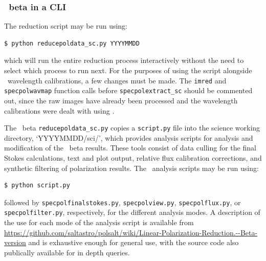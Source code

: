
\subsubsection{\polsalt\ beta in a \gls{CLI}}

The reduction script may be run using:
\begin{lstlisting}[language=bash]
$ python reducepoldata_sc.py YYYYMMDD
\end{lstlisting}
{\parskip=0pt which} will run the entire reduction process interactively without the need to select which process to run next. For the purposes of using the script alongside \iraf\ wavelength calibrations, a few changes must be made. The \texttt{imred} and \texttt{specpolwavmap} function calls before \texttt{specpolextract\_sc} should be commented out, since the raw images have already been processed and the wavelength calibrations were dealt with using \iraf.

The \polsalt\ beta \texttt{reducepoldata\_sc.py} copies a \texttt{script.py} file into the science working directory, `YYYYMMDD/sci/', which provides analysis scripts for analysis and modification of the \polsalt\ beta results. These tools consist of data culling for the final Stokes calculations, text and plot output, relative flux calibration corrections, and synthetic filtering of polarization results. The \polsalt\ analysis scripts may be run using:
\begin{lstlisting}[language=bash]
$ python script.py
\end{lstlisting}
{\parskip=0pt followed} by \texttt{specpolfinalstokes.py}, \texttt{specpolview.py}, \texttt{specpolflux.py}, or \texttt{specpol\-filter.py}, respectively, for the different analysis modes. A description of the use for each mode of the analysis script is available from \url{https://github.com/saltastro/polsalt/wiki/Linear-Polarization-Reduction.--Beta-version} and is exhaustive enough for general use, with the source code also publically available for in depth queries.

